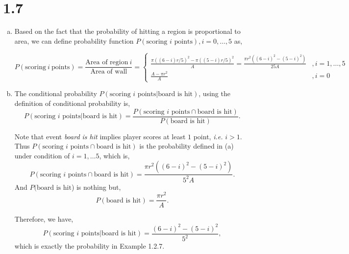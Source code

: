\documentclass[letter]{article}
\begin{document}
    \section*{1.7}
    \begin{enumerate}[(a)]
        \item Based on the fact that the probability of hitting a region is
        proportional to area, we can define probability function
        $P(\text{scoring $i$ points}), i=0,\dots,5$ as,

        \[
        P(\text{scoring}~i~\text{points}) = \frac{\text{Area of
        region}~i}{\text{Area of wall}} = 
        \begin{cases}
        \frac{\pi ((6-i)r/5)^2 - \pi((5-i)r/5)^2}{A} = \frac{\pi r^2
        \left((6-i)^2 - (5-i)^2\right)}{25A} &,  i = 1, \dots, 5\\
        \frac{A-\pi r^2}{A} &, i = 0
        \end{cases}
        \]
        \item The conditional probability 
        $P(\text{scoring $i$ points}|\text{board is hit})$, using the
        definition of conditional probability is,
        \[
        P(\text{scoring $i$ points}|\text{board is hit}) = \frac{
        P(\text{scoring $i$ points} \cap \text{board is hit})}{
        P(\text{board is hit})
        }.
        \]

        Note that event \emph{board is hit} implies player scores at least $1$
        point, \emph{i.e.} $i > 1$. 
        Thus $P(\text{scoring $i$ points} \cap \text{board is hit})$ is the
        probability defined in (a) under condition of $i=1, \dots 5$, which is,
        \[
        P(\text{scoring $i$ points} \cap \text{board is hit}) = \frac{\pi r^2
        \left((6-i)^2 - (5-i)^2\right)}{5^2A}.
        \]
        And $P(\text{board is hit}$) is nothing but, 
        \[
        P(\text{board is hit}) = \frac{\pi r^2}{A}.
        \]

        Therefore, we have,
        \[
        P(\text{scoring $i$ points}|\text{board is hit}) = \frac{(6-i)^2 -
        (5-i)^2}{5^2},
        \]
        which is exactly the probability in Example 1.2.7.

    \end{enumerate}
\end{document}
